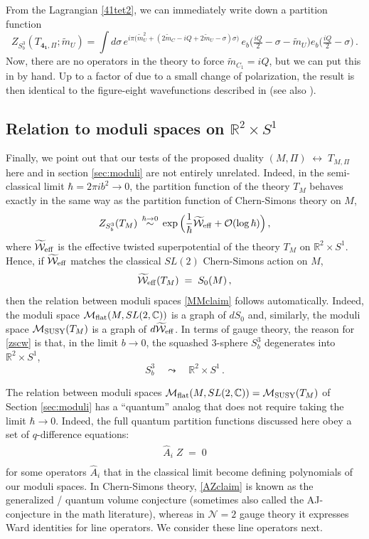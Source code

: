 \documentclass[hyper,letterpaper]{JHEP3}
\numberwithin{equation}{section}
\newcommand{\be}{\begin{equation}}
\newcommand{\ee}{\end{equation}}
\newcommand{\mb}{\mathbf}
\newcommand{\R}{{\mathbb R}}
\newcommand{\C}{{\mathbb C}}
\newcommand{\CM}{\mathcal{M}}
\newcommand{\CN}{\mathcal{N}}
\newcommand{\CO}{\mathcal{O}}
\newcommand{\CW}{\mathcal{W}}
\begin{document}
From the Lagrangian \eqref{41tet2}, we can immediately write down a partition function
%
\be Z_{S^3_b}(T_{\mb{4_1},\Pi};\tilde m_U) = \int d\sigma\, e^{i\pi\big(\tilde m_U^2+(2\tilde m_C-iQ+2\tilde m_U-\sigma)\sigma\big)}\,e_b\big(\tfrac{iQ}{2}-\sigma-\tilde m_U\big)e_b\big(\tfrac{iQ}{2}-\sigma\big)\,. \ee
%
Now, there are no operators in the theory to force $\tilde m_{C_1}=iQ$, but we can put this in by hand. Up to a factor of   due to a small change of  polarization, the result is then identical to the figure-eight wavefunctions described in \cite{hikami-2006, DGLZ, Dimofte-QRS} (see also \cite{Yamazaki-layered, SpirVar-knots}).




\subsection{Relation to moduli spaces on $\R^2\times S^1$}

Finally, we point out that our tests of the proposed duality $(M,\Pi) \; \leftrightarrow \; T_{M,\Pi}$
here and in section \ref{sec:moduli} are not entirely unrelated.
Indeed, in the semi-classical limit $\hbar = 2\pi i b^2 \to 0$, the partition function of
the theory $T_M$ behaves exactly in the same way as the partition function of Chern-Simons theory on $M$,
\be
Z_{S^3_b} (T_M) \,\overset{\hbar\to0}{\sim}\, \exp\Big(\frac1\hbar \widetilde{\CW}_{{\rm eff}} + \CO(\log\hbar)\Big)\,,
\label{zscw}
\ee
where $\widetilde{\CW}_{{\rm eff}}$ is the effective twisted superpotential of the theory $T_M$ on $\R^2 \times S^1$.
Hence, if $\widetilde{\CW}_{{\rm eff}}$ matches the classical $SL(2)$ Chern-Simons action on $M$,
\be
\widetilde{\CW}_{{\rm eff}} (T_M) \; = \; S_0 (M) \,,
\ee
then the relation between moduli spaces \eqref{MMclaim} follows automatically.
Indeed, the moduli space $\CM_{{\rm flat}} (M,SL(2,\C))$ is a graph of $d S_0$
and, similarly, the moduli space $\CM_{{\rm SUSY}} (T_M)$ is a graph of $d \widetilde{\CW}_{{\rm eff}}$.
In terms of gauge theory, the reason for \eqref{zscw} is that, in the limit $b \to 0$,
the squashed 3-sphere $S^3_b$ degenerates into $\R^2 \times S^1$,
%
\be
S^3_b \quad \leadsto \quad \R^2 \times S^1 \,.
\ee


The relation between moduli spaces $\CM_{\rm flat}(M,SL(2,\C)) = \CM_{\rm SUSY}(T_M)$ of Section \ref{sec:moduli} has a ``quantum'' analog
that does not require taking the limit $\hbar \to 0$.
Indeed, the full quantum partition functions discussed here obey a set of $q$-difference equations:
\be
\boxed{\phantom{\int}
\widehat{A}_i \; Z \; = \; 0
\phantom{\int}}
\label{AZclaim}
\ee
for some operators $\widehat{A}_i$ that in the classical limit become defining polynomials of our moduli spaces.
In Chern-Simons theory, \eqref{AZclaim} is known as the generalized / quantum volume conjecture \cite{gukov-2003}
(sometimes also called the AJ-conjecture \cite{Gar-Le,garoufalidis-2004} in the math literature),
whereas in $\CN=2$ gauge theory it expresses Ward identities for line operators. We consider these line operators next.
\end{document}
